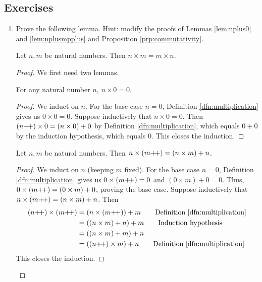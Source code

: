 \documentclass[../main.tex]{subfiles}
\begin{document}
\subsection*{Exercises}
\begin{enumerate}[ref={\thesection.\arabic*}]
    \item \label{exr:2.3.1}Prove the following lemma. Hint: modify the proofs of Lemmas \ref{lem:nplus0} and \ref{lem:nplusmpplus} and Proposition \ref{prp:commutativity}.
    \begin{lem}\label{lem:commutativityMult}
        Let $n,m$ be natural numbers. Then $n\times m=m\times n$.
        \begin{proof}
            We first need two lemmas.
            \begin{lem}\label{lem:ntimes0}
                For any natural number $n$, $n\times 0=0$.
                \begin{proof}
                    We induct on $n$. For the base case $n=0$, Definition \ref{dfn:multiplication} gives us $0\times 0=0$. Suppose inductively that $n\times 0=0$. Then $(n{+\!+})\times 0=(n\times 0)+0$ by Definition \ref{dfn:multiplication}, which equals $0+0$ by the induction hypothesis, which equals $0$. This closes the induction.
                \end{proof}
            \end{lem}
            \begin{lem}\label{lem:ntimesmpplus}
                Let $n,m$ be natural numbers. Then $n\times(m{+\!+})=(n\times m)+n$.
                \begin{proof}
                    We induct on $n$ (keeping $m$ fixed). For the base case $n=0$, Definition \ref{dfn:multiplication} gives us $0\times(m{+\!+})=0$ and $(0\times m)+0=0$. Thus, $0\times(m{+\!+})=(0\times m)+0$, proving the base case. Suppose inductively that $n\times(m{+\!+})=(n\times m)+n$. Then
                    \begin{align*}
                        (n\pplus)\times(m\pplus) &= (n\times(m\pplus))+m\tag*{Definition \ref{dfn:multiplication}}\\
                        &= ((n\times m)+n)+m\tag*{Induction hypothesis}\\
                        &= ((n\times m)+m)+n\\
                        &= ((n\pplus)\times m)+n\tag*{Definition \ref{dfn:multiplication}}
                    \end{align*}
                    This closes the induction.

\end{proof}
\end{lem}
\end{proof}
\end{lem}
\end{enumerate}
\end{document}
